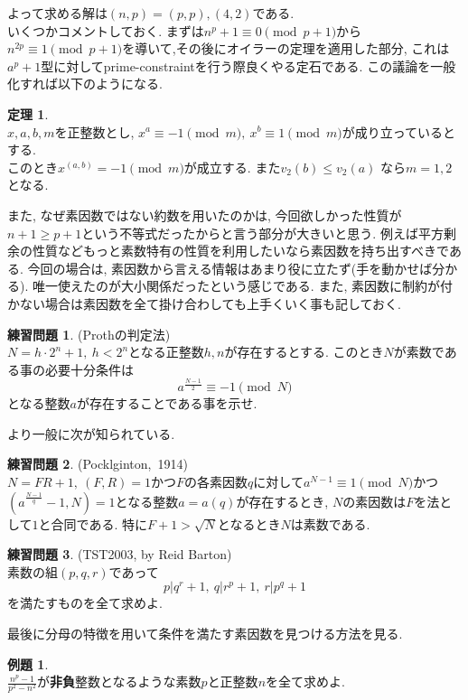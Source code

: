 \documentclass{ltjsarticle}
\theoremstyle{definition}
\newtheorem{thm}{定理}
\newtheorem{prob}{練習問題}
\newtheorem{expr}{例題}
\begin{document}
よって求める解は$(n,p)=(p,p),(4,2)$である.\\

いくつかコメントしておく. まずは$n^p+1\equiv0\pmod{p+1}$から$n^{2p}\equiv1\pmod{p+1}$を導いて,その後にオイラーの定理を適用した部分, これは$a^p+1$型に対してprime-constraintを行う際良くやる定石である. この議論を一般化すれば以下のようになる.

\begin{thm}\ \\
$x,a,b,m$を正整数とし, $x^a\equiv-1\pmod m,\ x^b\equiv1\pmod m$が成り立っているとする. \\このとき$x^{(a,b)}=-1\pmod m$が成立する. また$v_2(b)\leq v_2(a)$ なら$m=1,2$となる.
\end{thm}

また, なぜ素因数ではない約数を用いたのかは, 今回欲しかった性質が$n+1\geq p+1$という不等式だったからと言う部分が大きいと思う.
例えば平方剰余の性質などもっと素数特有の性質を利用したいなら素因数を持ち出すべきである. 今回の場合は, 素因数から言える情報はあまり役に立たず(手を動かせば分かる). 唯一使えたのが大小関係だったという感じである. また, 素因数に制約が付かない場合は素因数を全て掛け合わしても上手くいく事も記しておく.

\begin{prob}(Prothの判定法)\\
$N=h\cdot2^n+1,\ h<2^n$となる正整数$h,n$が存在するとする. このとき$N$が素数である事の必要十分条件は$$a^{\frac{N-1}2}\equiv-1\pmod N$$となる整数$a$が存在することである事を示せ.
\end{prob}

より一般に次が知られている.

\begin{prob}(Pocklginton,\ 1914)\\
$N=FR+1,\ (F,R)=1$かつ$F$の各素因数$q$に対して$a^{N-1}\equiv1\pmod N$かつ$(a^{\frac{N-1}q}-1,N)=1$となる整数$a=a(q)$が存在するとき, $N$の素因数は$F$を法として$1$と合同である. 特に$F+1>\sqrt N$となるとき$N$は素数である.
\end{prob}

\begin{prob}(TST2003, by Reid Barton)\\
素数の組$(p,q,r)$であって$$p|q^r+1,\ q|r^p+1,\ r|p^q+1$$を満たすものを全て求めよ.
\end{prob}

最後に分母の特徴を用いて条件を満たす素因数を見つける方法を見る.

\begin{expr}\ \\
$\displaystyle\frac{n^p-1}{p^2-n^2}$が\textbf{非負}整数となるような素数$p$と正整数$n$を全て求めよ.
\end{expr}
\end{document}
